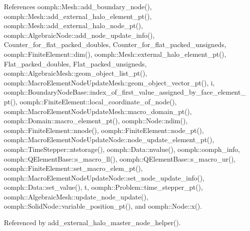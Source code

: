 References oomph\+::\+Mesh\+::add\+\_\+boundary\+\_\+node(), oomph\+::\+Mesh\+::add\+\_\+external\+\_\+halo\+\_\+element\+\_\+pt(), oomph\+::\+Mesh\+::add\+\_\+external\+\_\+halo\+\_\+node\+\_\+pt(), oomph\+::\+Algebraic\+Node\+::add\+\_\+node\+\_\+update\+\_\+info(), Counter\+\_\+for\+\_\+flat\+\_\+packed\+\_\+doubles, Counter\+\_\+for\+\_\+flat\+\_\+packed\+\_\+unsigneds, oomph\+::\+Finite\+Element\+::dim(), oomph\+::\+Mesh\+::external\+\_\+halo\+\_\+element\+\_\+pt(), Flat\+\_\+packed\+\_\+doubles, Flat\+\_\+packed\+\_\+unsigneds, oomph\+::\+Algebraic\+Mesh\+::geom\+\_\+object\+\_\+list\+\_\+pt(), oomph\+::\+Macro\+Element\+Node\+Update\+Mesh\+::geom\+\_\+object\+\_\+vector\+\_\+pt(), i, oomph\+::\+Boundary\+Node\+Base\+::index\+\_\+of\+\_\+first\+\_\+value\+\_\+assigned\+\_\+by\+\_\+face\+\_\+element\+\_\+pt(), oomph\+::\+Finite\+Element\+::local\+\_\+coordinate\+\_\+of\+\_\+node(), oomph\+::\+Macro\+Element\+Node\+Update\+Mesh\+::macro\+\_\+domain\+\_\+pt(), oomph\+::\+Domain\+::macro\+\_\+element\+\_\+pt(), oomph\+::\+Node\+::ndim(), oomph\+::\+Finite\+Element\+::nnode(), oomph\+::\+Finite\+Element\+::node\+\_\+pt(), oomph\+::\+Macro\+Element\+Node\+Update\+Node\+::node\+\_\+update\+\_\+element\+\_\+pt(), oomph\+::\+Time\+Stepper\+::ntstorage(), oomph\+::\+Data\+::nvalue(), oomph\+::oomph\+\_\+info, oomph\+::\+Q\+Element\+Base\+::s\+\_\+macro\+\_\+ll(), oomph\+::\+Q\+Element\+Base\+::s\+\_\+macro\+\_\+ur(), oomph\+::\+Finite\+Element\+::set\+\_\+macro\+\_\+elem\+\_\+pt(), oomph\+::\+Macro\+Element\+Node\+Update\+Node\+::set\+\_\+node\+\_\+update\+\_\+info(), oomph\+::\+Data\+::set\+\_\+value(), t, oomph\+::\+Problem\+::time\+\_\+stepper\+\_\+pt(), oomph\+::\+Algebraic\+Mesh\+::update\+\_\+node\+\_\+update(), oomph\+::\+Solid\+Node\+::variable\+\_\+position\+\_\+pt(), and oomph\+::\+Node\+::x().



Referenced by add\+\_\+external\+\_\+halo\+\_\+master\+\_\+node\+\_\+helper().

\mbox{\label{namespaceoomph_1_1Multi__domain__functions_aa0a1707ca80a12f948616e016a1ed191}} 
